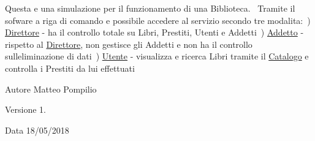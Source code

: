 Questa e\textquotesingle{} una simulazione per il funzionamento di una Biblioteca.~\newline
Tramite il sofware a riga di comando e\textquotesingle{} possibile accedere al servizio secondo tre modalita\textquotesingle{}\+:~) \mbox{\hyperlink{class_direttore}{Direttore}} -\/ ha il controllo totale su Libri, Prestiti, Utenti e Addetti~) \mbox{\hyperlink{class_addetto}{Addetto}} -\/ rispetto al \mbox{\hyperlink{class_direttore}{Direttore}}, non gestisce gli Addetti e non ha il controllo sull\textquotesingle{}eliminazione di dati~) \mbox{\hyperlink{class_utente}{Utente}} -\/ visualizza e ricerca Libri tramite il \mbox{\hyperlink{class_catalogo}{Catalogo}} e controlla i Prestiti da lui effettuati~\newline
\begin{DoxyAuthor}{Autore}
Matteo Pompilio 
\end{DoxyAuthor}
\begin{DoxyVersion}{Versione}
1. 
\end{DoxyVersion}
\begin{DoxyDate}{Data}
18/05/2018 
\end{DoxyDate}
